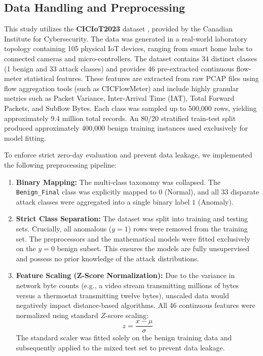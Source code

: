 \documentclass{article}
\begin{document}
\subsection{Data Handling and Preprocessing}
This study utilizes the \textbf{CICIoT2023} dataset \cite{ciciot2023}, provided by the Canadian Institute for Cybersecurity. The data was generated in a real-world laboratory topology containing 105 physical IoT devices, ranging from smart home hubs to connected cameras and micro-controllers. The dataset contains 34 distinct classes (1 benign and 33 attack classes) and provides 46 pre-extracted continuous flow-meter statistical features. These features are extracted from raw PCAP files using flow aggregation tools (such as CICFlowMeter) and include highly granular metrics such as Packet Variance, Inter-Arrival Time (IAT), Total Forward Packets, and Subflow Bytes. Each class was sampled up to 500,000 rows, yielding approximately 9.4 million total records. An 80/20 stratified train-test split produced approximately 400,000 benign training instances used exclusively for model fitting.

To enforce strict zero-day evaluation and prevent data leakage, we implemented the following preprocessing pipeline:

\begin{enumerate}
    \item \textbf{Binary Mapping:} The multi-class taxonomy was collapsed. The \texttt{Benign\_Final} class was explicitly mapped to $0$ (Normal), and all 33 disparate attack classes were aggregated into a single binary label $1$ (Anomaly).
    \item \textbf{Strict Class Separation:} The dataset was split into training and testing sets. Crucially, all anomalous ($y=1$) rows were removed from the training set. The preprocessors and the mathematical models were fitted exclusively on the $y=0$ benign subset. This ensures the models are fully unsupervised and possess no prior knowledge of the attack distributions.
    \item \textbf{Feature Scaling (Z-Score Normalization):} Due to the variance in network byte counts (e.g., a video stream transmitting millions of bytes versus a thermostat transmitting twelve bytes), unscaled data would negatively impact distance-based algorithms. All 46 continuous features were normalized using standard $Z$-score scaling: 
    $$ z = \frac{x - \mu}{\sigma} $$
    The standard scaler was fitted solely on the benign training data and subsequently applied to the mixed test set to prevent data leakage.
\end{enumerate}
\end{document}
